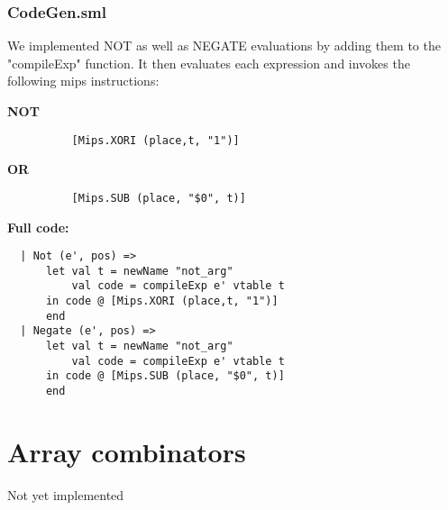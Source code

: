 \documentclass[12pt]{article}
\begin{document}
\subsubsection{CodeGen.sml}
We implemented NOT as well as NEGATE evaluations by adding them to the "compileExp" function. It then evaluates each expression and invokes the following mips instructions:

\textbf{NOT}
\begin{verbatim}
          [Mips.XORI (place,t, "1")]
\end{verbatim}

\textbf{OR}
\begin{verbatim}
          [Mips.SUB (place, "$0", t)]
\end{verbatim}
\clearpage
\textbf{Full code:}
\begin{verbatim}
  | Not (e', pos) =>
      let val t = newName "not_arg"
          val code = compileExp e' vtable t
      in code @ [Mips.XORI (place,t, "1")]
      end
  | Negate (e', pos) =>
      let val t = newName "not_arg"
          val code = compileExp e' vtable t
      in code @ [Mips.SUB (place, "$0", t)]
      end
\end{verbatim}
\section{Array combinators}
Not yet implemented
\end{document}
